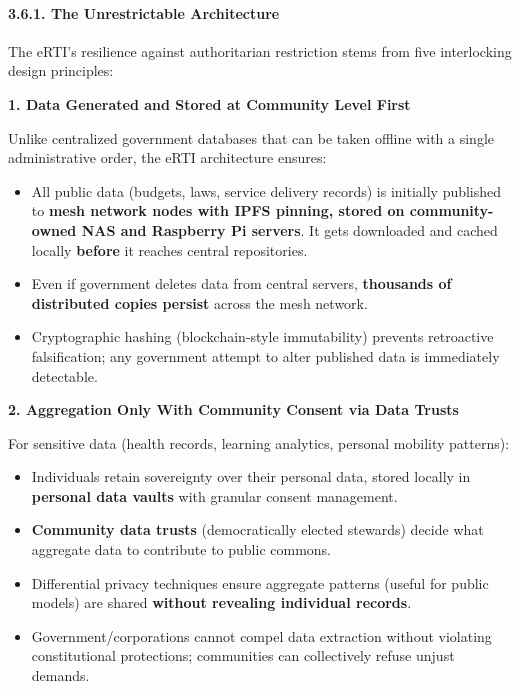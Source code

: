\paragraph{3.6.1. The Unrestrictable
Architecture}\label{the-unrestrictable-architecture}

The eRTI's resilience against authoritarian restriction stems from five
interlocking design principles:

\textbf{1. Data Generated and Stored at Community Level First}

Unlike centralized government databases that can be taken offline with a
single administrative order, the eRTI architecture ensures:

\begin{itemize}
\tightlist
\item
  All public data (budgets, laws, service delivery records) is initially
  published to \textbf{mesh network nodes with IPFS pinning, stored on
  community-owned NAS and Raspberry Pi servers}. It gets downloaded and
  cached locally \textbf{before} it reaches central repositories.
\item
  Even if government deletes data from central servers,
  \textbf{thousands of distributed copies persist} across the mesh
  network.
\item
  Cryptographic hashing (blockchain-style immutability) prevents
  retroactive falsification; any government attempt to alter published
  data is immediately detectable.
\end{itemize}

\textbf{2. Aggregation Only With Community Consent via Data Trusts}

For sensitive data (health records, learning analytics, personal
mobility patterns):

\begin{itemize}
\tightlist
\item
  Individuals retain sovereignty over their personal data, stored
  locally in \textbf{personal data vaults} with granular consent
  management.
\item
  \textbf{Community data trusts} (democratically elected stewards)
  decide what aggregate data to contribute to public commons.
\item
  Differential privacy techniques ensure aggregate patterns (useful for
  public models) are shared \textbf{without revealing individual
  records}.
\item
  Government/corporations cannot compel data extraction without
  violating constitutional protections; communities can collectively
  refuse unjust demands.
\end{itemize}

